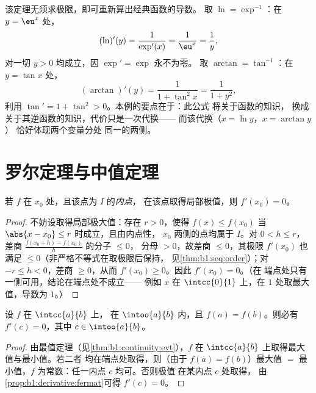 \begin{example}[两次求逆函数的导数]\label{ex:b1:derivative:inverseaction}
该定理无须求极限，即可重新算出经典函数的导数。
取 $\ln = \exp^{-1}$：在 $y = \eu^x$ 处，
\[
(\ln)'(y) = \frac{1}{\exp'(x)} = \frac{1}{\eu^{x}} = \frac1y ,
\]
对一切 $y > 0$ 均成立，因 $\exp' = \exp$ 永不为零。
取 $\arctan = \tan^{-1}$：在 $y = \tan x$ 处，
\[
(\arctan)'(y) = \frac{1}{1 + \tan^2 x} = \frac{1}{1 + y^2} ,
\]
利用 $\tan' = 1 + \tan^2 > 0$。本例的要点在于：此公式
将关于函数的知识，
换成关于其逆函数的知识，代价只是一次代换——
而该代换（$x = \ln y$，$x = \arctan y$）
恰好体现两个变量分处
同一的两侧。
\end{example}

\section{罗尔定理与中值定理}

\begin{proposition}[内点极值]\label{prop:b1:derivative:fermat}
若 $f$ 在 $x_0$ 处，且该点为 $I$ 的\emph{内点}，
在该点取得局部极值，则 $f'(x_0) = 0$。
\end{proposition}

\begin{proof}
不妨设取得局部极大值：存在 $r > 0$，使得 $f(x) \leq f(x_0)$
当 $\abs{x - x_0} \leq r$ 时成立，且由内点性，
$x_0$ 两侧的点均属于 $I$。对 $0 < h \leq r$，
差商 $\frac{f(x_0 + h) - f(x_0)}{h}$ 的分子 $\leq 0$，
分母 $> 0$，故差商 $\leq 0$，其极限 $f'(x_0)$
也满足 $\leq 0$（非严格不等式在取极限后保持，
见\cref{thm:b1:seq:order}）；对 $-r \leq h < 0$，差商
$\geq 0$，从而 $f'(x_0) \geq 0$。因此 $f'(x_0) = 0$。（在
端点处只有一侧可用，结论在端点处不成立——
例如 $x$ 在 $\intcc{0}{1}$ 上，在 $1$ 处取最大值，导数为
$1$。）
\end{proof}

\begin{theorem}[罗尔定理]\label{thm:b1:derivative:rolle}
设 $f$ 在 $\intcc{a}{b}$ 上，
在 $\intoo{a}{b}$ 内，且 $f(a) = f(b)$。则必有 $f'(c) = 0$，其中 $c \in
\intoo{a}{b}$。
\end{theorem}

\begin{proof}
由最值定理（见\cref{thm:b1:continuity:evt}），$f$
在 $\intcc{a}{b}$ 上取得最大值与最小值。若二者
均在端点处取得，则（由于 $f(a) = f(b)$）最大值 $=$ 最小值，$f$
为常数：任一内点 $c$ 均可。否则极值
在某内点 $c$ 处取得，
由\cref{prop:b1:derivative:fermat}可得 $f'(c) = 0$。
\end{proof}

